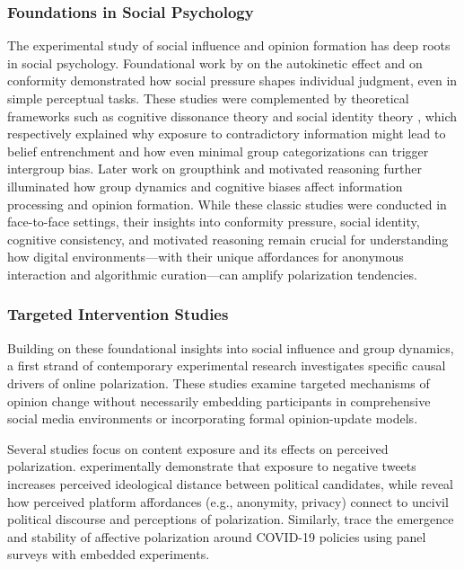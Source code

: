\subsubsection{Foundations in Social Psychology}
The experimental study of social influence and opinion formation has deep roots in social psychology. Foundational work by \citep{sherif_psychology_1936} on the autokinetic effect and \citep{asch_effects_1951} on conformity demonstrated how social pressure shapes individual judgment, even in simple perceptual tasks. These studies were complemented by theoretical frameworks such as cognitive dissonance theory \citep{festinger_theory_1957} and social identity theory \citep{tajfel_social_1971}, which respectively explained why exposure to contradictory information might lead to belief entrenchment and how even minimal group categorizations can trigger intergroup bias. Later work on groupthink \citep{janis_groupthink_1982} and motivated reasoning \citep{kunda_case_1990} further illuminated how group dynamics and cognitive biases affect information processing and opinion formation. While these classic studies were conducted in face-to-face settings, their insights into conformity pressure, social identity, cognitive consistency, and motivated reasoning remain crucial for understanding how digital environments—with their unique affordances for anonymous interaction and algorithmic curation—can amplify polarization tendencies.

\subsubsection{Targeted Intervention Studies}
Building on these foundational insights into social influence and group dynamics, a first strand of contemporary experimental research investigates specific causal drivers of online polarization. These studies examine targeted mechanisms of opinion change without necessarily embedding participants in comprehensive social media environments or incorporating formal opinion-update models.

Several studies focus on content exposure and its effects on perceived polarization. \citep{banks_polarizedfeeds_2021} experimentally demonstrate that exposure to negative tweets increases perceived ideological distance between political candidates, while \citep{wuestenenk_influence_2023} reveal how perceived platform affordances (e.g., anonymity, privacy) connect to uncivil political discourse and perceptions of polarization. Similarly, \citep{schieferdecker_affective_2024} trace the emergence and stability of affective polarization around COVID-19 policies using panel surveys with embedded experiments.


